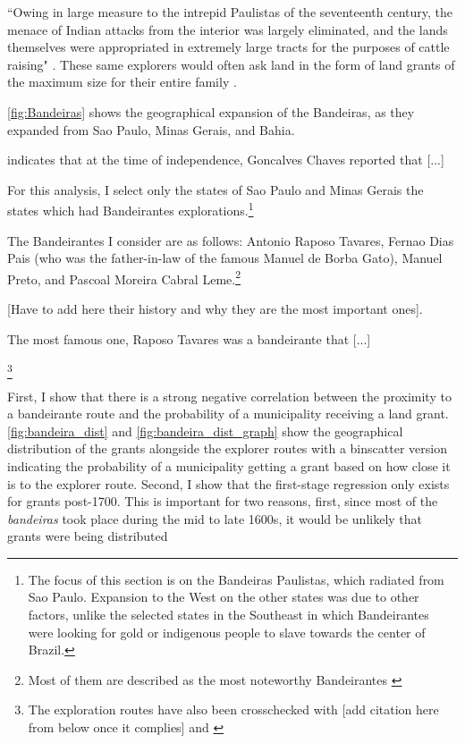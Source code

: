 \documentclass{article}
\begin{document}
``Owing in large measure to the intrepid Paulistas of the seventeenth century, the menace of Indian attacks from the interior was largely eliminated, and the lands themselves were appropriated in extremely large tracts for the purposes of cattle raising" \parencite[p.~320]{Smith1972-dv}. 
These same explorers would often ask land in the form of land grants of the maximum size for their entire family \parencite[p.~320]{Smith1972-dv}.

\autoref{fig:Bandeiras} shows the geographical expansion of the Bandeiras, as they expanded from Sao Paulo, Minas Gerais, and Bahia.


\textcite[p.~44]{Lima1954-td} indicates that at the time of independence, Goncalves Chaves reported that [...]

For this analysis, I select only the states of Sao Paulo and Minas Gerais the states which had Bandeirantes explorations.\footnote{The focus of this section is on the Bandeiras Paulistas, which radiated from Sao Paulo. Expansion to the West on the other states was due to other factors, unlike the selected states in the Southeast in which Bandeirantes were looking for gold or indigenous people to slave towards the center of Brazil.}

The Bandeirantes I consider are as follows: Antonio Raposo Tavares, Fernao Dias Pais (who was the father-in-law of the famous Manuel de Borba Gato), Manuel Preto, and Pascoal Moreira Cabral Leme.\footnote{Most of them are described as the most noteworthy Bandeirantes \parencite[p.~43]{Prestes_Filho2012-dp}}

[Have to add here their history and why they are the most important ones].

The most famous one, Raposo Tavares was a bandeirante that [...] 
\parencite{Franco1954-bk}

\footnote{The exploration routes have also been crosschecked with [add citation here from below once it complies] and \textcite{Santos2022-rv}}

First, I show that there is a strong negative correlation between the proximity to a bandeirante route and the probability of a municipality receiving a land grant. 
\autoref{fig:bandeira_dist} and \autoref{fig:bandeira_dist_graph} show the geographical distribution of the grants alongside the explorer routes with a binscatter version indicating the probability of a municipality getting a grant based on how close it is to the explorer route. 
Second, I show that the first-stage regression only exists for grants post-1700. 
This is important for two reasons, first, since most of the \textit{bandeiras} took place during the mid to late 1600s, it would be unlikely that grants were being distributed 
\end{document}
